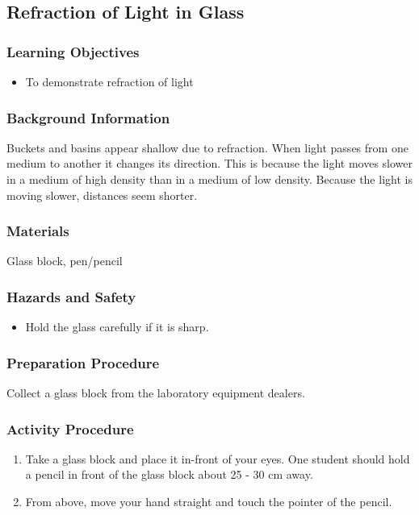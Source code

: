 \subsection{Refraction of Light in Glass}

\subsubsection*{Learning Objectives}
\begin{itemize}
\item{To demonstrate refraction of light} 
\end{itemize}

\subsubsection*{Background Information}
Buckets and basins appear shallow due to refraction. When light passes from one medium to another it changes its direction. This is because the light moves slower in a medium of high density than in a medium of low density. Because the light is moving slower, distances seem shorter.  

\subsubsection*{Materials}
Glass block, pen/pencil

\subsubsection*{Hazards and Safety}
\begin{itemize}
\item{Hold the glass carefully if it is sharp.} 
\end{itemize}

\subsubsection*{Preparation Procedure}
Collect a glass block from the laboratory equipment dealers.

\subsubsection*{Activity Procedure}
\begin{enumerate}
\item{Take a glass block and place it in-front of your eyes. One student should hold a pencil in front of the glass block about 25 - 30 cm away.} 
\item{From above, move your hand straight and touch the pointer of the pencil.} 
\end{enumerate}

